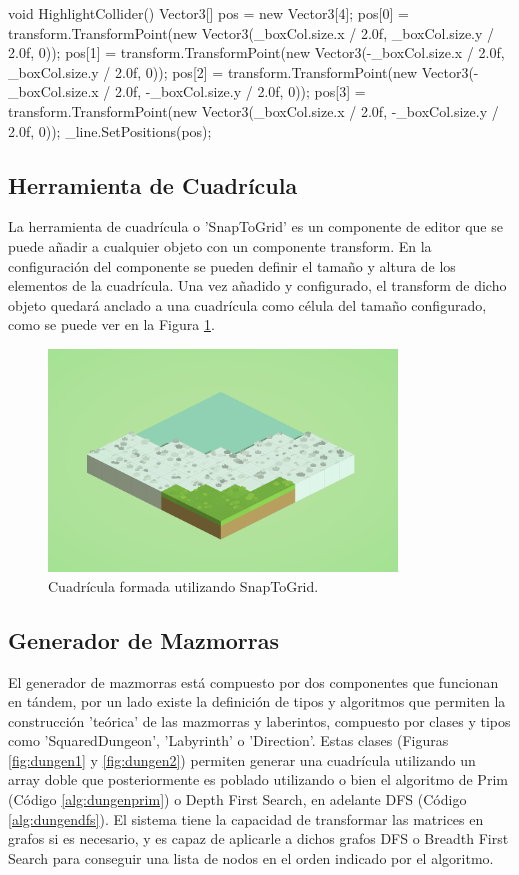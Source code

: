 \begin{mypython}[caption={Algoritmo para pintar un box collider 2D.},label={alg:debugbox2d}]
    void HighlightCollider()
    {
        Vector3[] pos = new Vector3[4];
        pos[0] = transform.TransformPoint(new Vector3(_boxCol.size.x / 2.0f, _boxCol.size.y / 2.0f, 0));
        pos[1] = transform.TransformPoint(new Vector3(-_boxCol.size.x / 2.0f, _boxCol.size.y / 2.0f, 0));
        pos[2] = transform.TransformPoint(new Vector3(-_boxCol.size.x / 2.0f, -_boxCol.size.y / 2.0f, 0));
        pos[3] = transform.TransformPoint(new Vector3(_boxCol.size.x / 2.0f, -_boxCol.size.y / 2.0f, 0));
        _line.SetPositions(pos);
    }
\end{mypython}

\subsection{Herramienta de Cuadrícula}
La herramienta de cuadrícula o 'SnapToGrid' es un componente de editor que se puede añadir a cualquier objeto con un componente transform. En la configuración del componente
 se pueden definir el tamaño y altura de los elementos de la cuadrícula. Una vez añadido y configurado, el transform de dicho objeto quedará anclado a una cuadrícula como 
 célula del tamaño configurado, como se puede ver en la Figura \ref{fig:snaptogrid}.

 \begin{figure}[H]
  \centering
    \includegraphics[width=350px,clip=true]{snaptogrid.png}
  \caption{Cuadrícula formada utilizando SnapToGrid.}
  \label{fig:snaptogrid}
\end{figure}

\subsection{Generador de Mazmorras}
El generador de mazmorras está compuesto por dos componentes  que funcionan en tándem, por un lado existe la definición de tipos y algoritmos que permiten la construcción 
'teórica' de las mazmorras y laberintos, compuesto por clases y tipos como 'SquaredDungeon', 'Labyrinth' o 'Direction'. Estas clases (Figuras \ref{fig:dungen1} y \ref{fig:dungen2}) permiten generar una cuadrícula utilizando 
un array doble que posteriormente es poblado utilizando o bien el algoritmo de Prim (Código \ref{alg:dungenprim}) o Depth First Search, en adelante DFS (Código \ref{alg:dungendfs}). El sistema tiene la capacidad de transformar las matrices en grafos si es necesario, y es capaz de aplicarle a dichos grafos 
DFS o Breadth First Search para conseguir una lista de nodos en el orden indicado por el algoritmo.  

